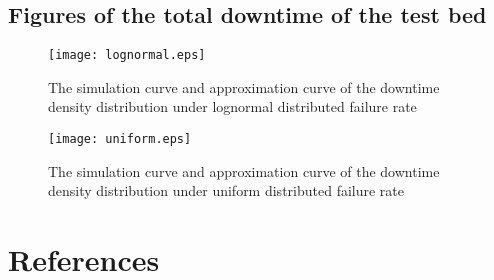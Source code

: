 \documentclass[preprint,12pt]{elsarticle}
\begin{document}
\begin{appendices}
\section{Figures of the total downtime of the test bed}

\begin{figure}
\centering
\texttt{[image: lognormal.eps]}
 \caption{The simulation curve and approximation curve of the downtime density distribution under lognormal distributed failure rate}
 \label{fig:lognormal}
\end{figure}


\begin{figure}
\centering
\texttt{[image: uniform.eps]}
 \caption{The simulation curve and approximation curve of the downtime density distribution under uniform distributed failure rate}
  \label{fig:uniform}
\end{figure}

\end{appendices}

\newpage
\section{References}


\end{document}
